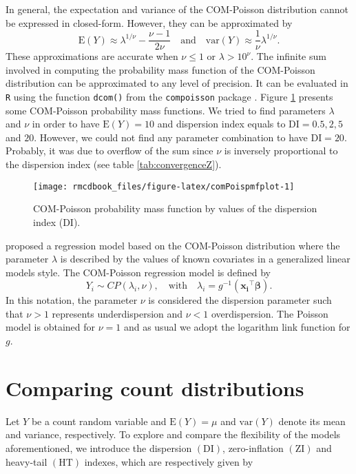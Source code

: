 \documentclass[9pt,a5paper,]{book}
\theoremstyle{definition}
\theoremstyle{definition}
\theoremstyle{remark}
\begin{document}
In general, the expectation and variance of the COM-Poisson distribution
cannot be expressed in closed-form. However, they can be approximated by
\[\mathrm{E}(Y) \approx \lambda^{1/\nu} - \frac{\nu - 1}{2 \nu}
\quad \text{and} \quad
\mathrm{var}(Y) \approx \frac{1}{\nu} \lambda^{1 /\nu}.
\] These approximations are accurate when \(\nu \leq 1\) or
\(\lambda > 10^{\nu}\). The infinite sum involved in computing the
probability mass function of the COM-Poisson distribution can be
approximated to any level of precision. It can be evaluated in
\texttt{R} using the function \texttt{dcom()} from the
\texttt{compoisson} package \citep{Dunn2012}. Figure
\ref{fig:comPoispmfplot} presents some COM-Poisson probability mass
functions. We tried to find parameters \(\lambda\) and \(\nu\) in order
to have \(\mathrm{E}(Y) = 10\) and dispersion index equals to
\(\mathrm{DI} = 0.5, 2, 5\) and \(20\). However, we could not find any
parameter combination to have \(\mathrm{DI} = 20\). Probably, it was due
to overflow of the sum since \(\nu\) is inversely proportional to the
dispersion index (see table \ref{tab:convergenceZ}).

\begin{figure}[h]

{\centering \texttt{[image: rmcdbook\_files/figure-latex/comPoispmfplot-1]} 

}

\caption{COM-Poisson probability mass function by values of the dispersion index (DI).}\label{fig:comPoispmfplot}
\end{figure}

\citet{Sellers2010} proposed a regression model based on the COM-Poisson
distribution where the parameter \(\lambda\) is described by the values
of known covariates in a generalized linear models style. The
COM-Poisson regression model is defined by
\[Y_i \sim CP(\lambda_i, \nu), \quad  \text{with} \quad \lambda_i = g^{-1}(\boldsymbol{x_i}^{\top} \boldsymbol{\beta}).\]
In this notation, the parameter \(\nu\) is considered the dispersion
parameter such that \(\nu > 1\) represents underdispersion and
\(\nu < 1\) overdispersion. The Poisson model is obtained for
\(\nu = 1\) and as usual we adopt the logarithm link function for \(g\).

\section{Comparing count
distributions}\label{comparing-count-distributions}

Let \(Y\) be a count random variable and \(\mathrm{E}(Y) = \mu\) and
\(\mathrm{var}(Y)\) denote its mean and variance, respectively. To
explore and compare the flexibility of the models aforementioned, we
introduce the dispersion \((\mathrm{DI})\), zero-inflation
\((\mathrm{ZI})\) and heavy-tail \((\mathrm{HT})\) indexes, which are
respectively given by
\end{document}
